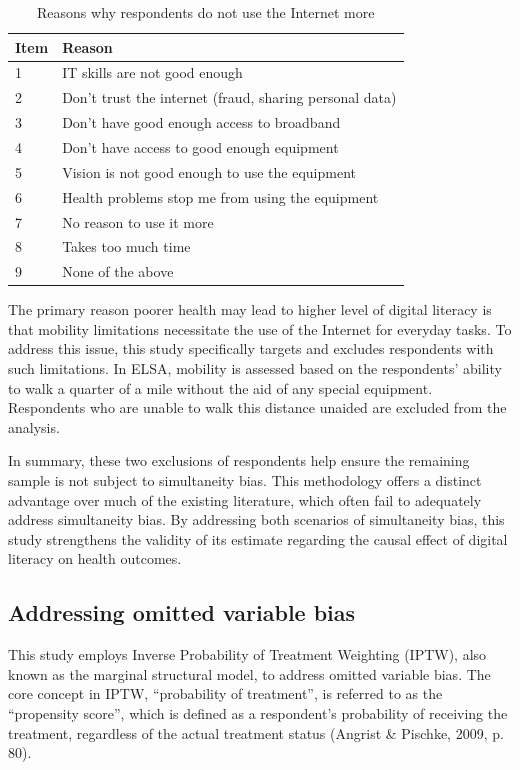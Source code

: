 \begin{table}[h!]
    \centering
    \caption{Reasons why respondents do not use the Internet more}
    \label{tab:reverse_causality}
    \begin{tabular}{ll}
        \toprule
        Item & Reason \\
        \midrule
        1 & IT skills are not good enough \\
        2 & Don't trust the internet (fraud, sharing personal data) \\
        3 & Don't have good enough access to broadband \\
        4 & Don't have access to good enough equipment \\
        5 & Vision is not good enough to use the equipment \\ 
        6 & Health problems stop me from using the equipment \\ 
        7 & No reason to use it more \\
        8 & Takes too much time \\
        9 & None of the above \\
        \bottomrule
    \end{tabular}
\end{table}

The primary reason poorer health may lead to higher level of digital literacy is that mobility limitations necessitate the use of the Internet for everyday tasks. To address this issue, this study specifically targets and excludes respondents with such limitations. In ELSA, mobility is assessed based on the respondents' ability to walk a quarter of a mile without the aid of any special equipment. Respondents who are unable to walk this distance unaided are excluded from the analysis.

In summary, these two exclusions of respondents help ensure the remaining sample is not subject to simultaneity bias. This methodology offers a distinct advantage over much of the existing literature, which often fail to adequately address simultaneity bias. By addressing both scenarios of simultaneity bias, this study strengthens the validity of its estimate regarding the causal effect of digital literacy on health outcomes.

\subsection{Addressing omitted variable bias}
This study employs Inverse Probability of Treatment Weighting (IPTW), also known as the marginal structural model, to address omitted variable bias. The core concept in IPTW, ``probability of treatment”, is referred to as the “propensity score”, which is defined as a respondent's probability of receiving the treatment, regardless of the actual treatment status (Angrist \& Pischke, 2009, p. 80). 

